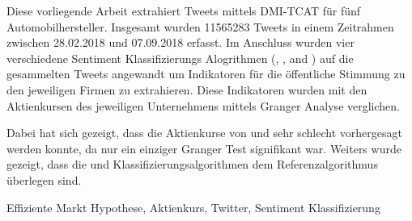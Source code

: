 Diese vorliegende Arbeit extrahiert Tweets mittels DMI-TCAT für fünf Automobilhersteller.
Insgesamt wurden 11565283 Tweets in einem Zeitrahmen zwischen 28.02.2018 und 07.09.2018 erfasst.
Im Anschluss wurden vier verschiedene Sentiment Klassifizierungs Alogrithmen (\tb{}, \nb{}, \me{} and \svm{}) auf die gesammelten Tweets angewandt um Indikatoren für die öffentliche Stimmung zu den jeweiligen Firmen zu extrahieren.
Diese Indikatoren wurden mit den Aktienkursen des jeweiligen Unternehmens mittels Granger Analyse verglichen.

Dabei hat sich gezeigt, dass die Aktienkurse von \ford{} und \hyundai{} sehr schlecht vorhergesagt werden konnte, da nur ein einziger Granger Test signifikant war.
Weiters wurde gezeigt, dass die \svm{} und \nb{} Klassifizierungsalgorithmen dem Referenzalgorithmus \tb{} überlegen sind.

\SomeSpace
{}
\normalsize
\noindent
Effiziente Markt Hypothese, Aktienkurs, Twitter, Sentiment Klassifizierung

\glsresetall